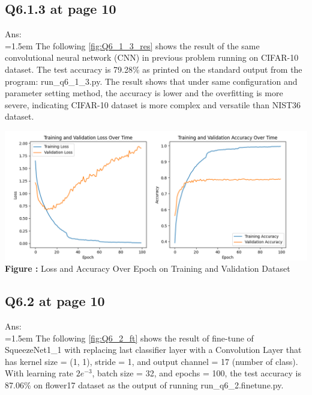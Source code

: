 \documentclass{article}
\begin{document}
	\subsection*{Q6.1.3 at page 10\texttt{}}
	Ans:\\
	\hangindent=1.5em \hspace{1.5em}The following \autoref{fig:Q6_1_3_res} shows the result of the same convolutional neural network (CNN) in previous problem running on CIFAR-10 dataset. The test accuracy is 79.28\% as printed on the standard output from the program: run\_q6\_1\_3.py. The result shows that under same configuration and parameter setting method, the accuracy is lower and the overfitting is more severe, indicating CIFAR-10 dataset is more complex and versatile than NIST36 dataset.
	\newline

\begin{minipage}{1\linewidth}
	\centering
	\hspace{0.12\linewidth} 
	\includegraphics[width=1\linewidth]{./Q6_1_3_res.png}  %
	\newline
	\textbf{Figure \thefigure:} Loss and Accuracy Over Epoch on Training and Validation Dataset %
	\label{fig:Q6_1_3_res}  %
\end{minipage}
\newline


	\newpage	
	\subsection*{Q6.2 at page 10\texttt{}}
	Ans:\\
	\hangindent=1.5em \hspace{1.5em}The following \autoref{fig:Q6_2_ft} shows the result of fine-tune of SqueezeNet1\_1 with replacing last classifier layer with a Convolution Layer that has kernel size = (1, 1), stride = 1, and output channel = 17 (number of class). With learning rate $2e^{-3}$, batch size = 32, and epochs = 100, the test accuracy is 87.06\% on flower17 dataset as the output of running run\_q6\_2.finetune.py.
	\newline
	
\end{document}
